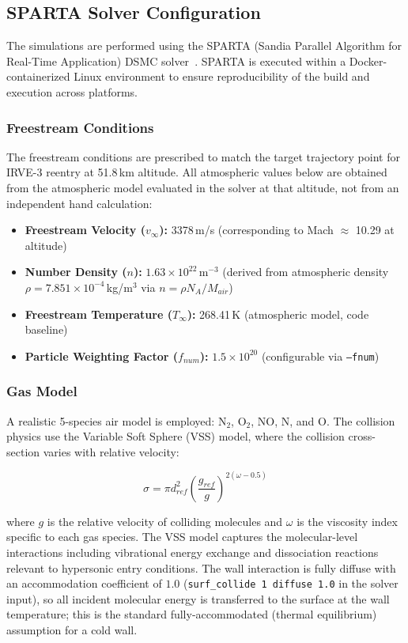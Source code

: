 \subsection{SPARTA Solver Configuration}
The simulations are performed using the SPARTA (Sandia Parallel Algorithm for Real-Time Application) DSMC solver~\cite{plimpton2014sparta}. SPARTA is executed within a Docker-containerized Linux environment to ensure reproducibility of the build and execution across platforms.

\subsubsection*{Freestream Conditions}
The freestream conditions are prescribed to match the target trajectory point for IRVE-3 reentry at 51.8\,km altitude. All atmospheric values below are obtained from the atmospheric model evaluated in the solver at that altitude, not from an independent hand calculation:

\begin{itemize}
    \item \textbf{Freestream Velocity ($v_{\infty}$):} 3378\,m/s (corresponding to Mach $\approx$ 10.29 at altitude)
    \item \textbf{Number Density ($n$):} $1.63 \times 10^{22}$\,m$^{-3}$ (derived from atmospheric density $\rho = 7.851 \times 10^{-4}$\,kg/m$^3$ via $n = \rho N_A / M_{air}$)
    \item \textbf{Freestream Temperature ($T_{\infty}$):} 268.41\,K (atmospheric model, code baseline)
    \item \textbf{Particle Weighting Factor ($f_{num}$):} $1.5 \times 10^{20}$ (configurable via \texttt{--fnum})
\end{itemize}

\subsubsection*{Gas Model}
A realistic 5-species air model is employed: N$_2$, O$_2$, NO, N, and O. The collision physics use the Variable Soft Sphere (VSS) model, where the collision cross-section varies with relative velocity:

\begin{equation}
    \sigma = \pi d_{ref}^2 \left( \frac{g_{ref}}{g} \right)^{2(\omega - 0.5)}
\end{equation}

where $g$ is the relative velocity of colliding molecules and $\omega$ is the viscosity index specific to each gas species. The VSS model captures the molecular-level interactions including vibrational energy exchange and dissociation reactions relevant to hypersonic entry conditions. The wall interaction is fully diffuse with an accommodation coefficient of $1.0$ (\texttt{surf\_collide 1 diffuse 1.0} in the solver input), so all incident molecular energy is transferred to the surface at the wall temperature; this is the standard fully-accommodated (thermal equilibrium) assumption for a cold wall.

